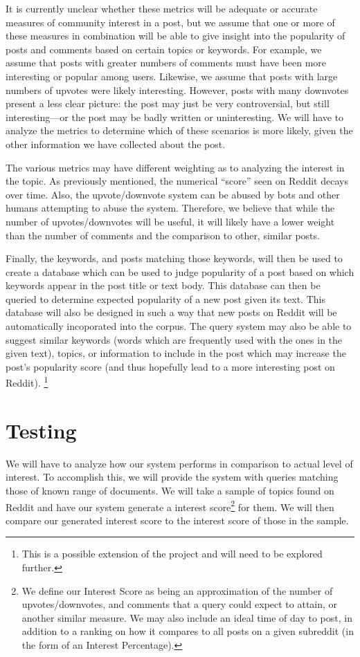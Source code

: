 \documentclass{acm_proc_article-sp}
\begin{document}
It is currently unclear whether these metrics will be adequate or accurate measures of community interest
in a post, but we assume that one or more of these measures in combination will be able to give insight
into the popularity of posts and comments based on certain topics or keywords.  For example, we assume that
posts with greater numbers of comments must have been more interesting or popular among users.  Likewise, we
assume that posts with large numbers of upvotes were likely interesting.  However, posts with many downvotes
present a less clear picture: the post may just be very controversial, but still interesting---or the post
may be badly written or uninteresting.  We will have to analyze the metrics to determine which of these
scenarios is more likely, given the other information we have collected about the post.

The various metrics may have different weighting as to analyzing the interest in the topic. As previously mentioned,
the numerical ``score'' seen on Reddit decays over time. Also, the upvote/downvote system can be abused by bots and
other humans attempting to abuse the system. Therefore, we believe that while the number of upvotes/downvotes will be 
useful, it will likely have a lower weight than the number of comments and the comparison to other, similar posts.



Finally, the keywords, and posts matching those keywords, will then be used to create a database which
can be used to judge popularity of a post based on which keywords appear in the post title or text
body.  This database can then be queried to determine expected popularity of a new post given its
text.  This database will also be designed in such a way that new posts on Reddit will be automatically
incoporated into the corpus.
The query system may also be able to suggest similar keywords (words which are frequently used with
the ones in the given text), topics, or information to include in the post which may increase
the post's popularity score (and thus hopefully lead to a more interesting post on Reddit).
\footnote{This is a possible extension of the project and will need to be explored further.}

\section{Testing}
We will have to analyze how our system performs in comparison to actual level of interest. To accomplish this, we will
provide the system with queries matching those of known range of documents. We will take a sample of topics found on Reddit
and have our system generate a interest score\footnote{We define our Interest Score as being an approximation of the number of
upvotes/downvotes, and comments that a query could expect to attain, or another similar measure. We may also include an ideal time of day to post, in addition
to a ranking on how it compares to all posts on a given subreddit (in the form of an Interest Percentage).} for them. 
We will then compare our generated interest score to the interest score of those in the sample.
\end{document}
